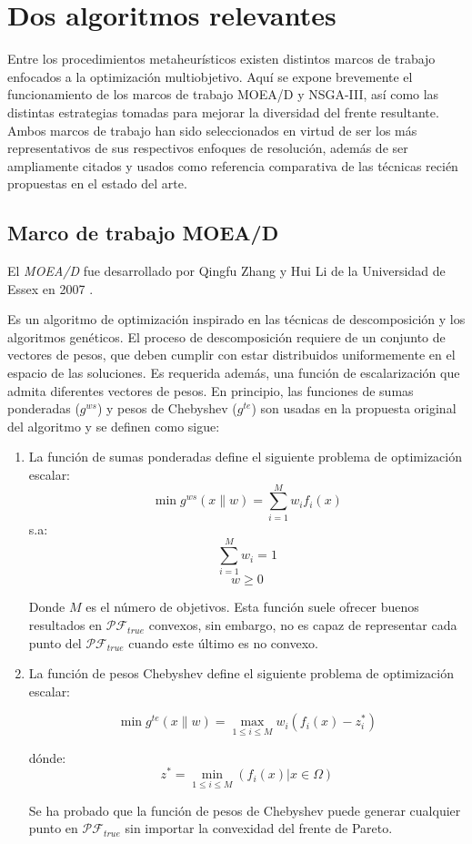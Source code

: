 \section{Dos algoritmos relevantes}

Entre los procedimientos metaheurísticos existen distintos marcos de trabajo enfocados a la optimización multiobjetivo.
Aquí se expone brevemente el funcionamiento de los marcos de trabajo MOEA/D y NSGA-III, así como las distintas estrategias tomadas para mejorar la diversidad del frente resultante.
Ambos marcos de trabajo han sido seleccionados en virtud de ser los más representativos de sus respectivos enfoques de resolución, además de ser ampliamente citados y usados como 
referencia comparativa de las técnicas recién propuestas en el estado del arte.

\subsection{Marco de trabajo MOEA/D}
El \emph{MOEA/D} fue desarrollado por Qingfu Zhang y Hui Li de la Universidad de Essex en 2007 \cite{4358754}.

Es un algoritmo de optimización inspirado en las técnicas de descomposición y los algoritmos genéticos. El proceso de descomposición requiere de un conjunto de vectores de pesos,
que deben cumplir con estar distribuidos uniformemente en el espacio de las soluciones. Es requerida además, una función de escalarización que admita diferentes vectores de pesos. En principio,
las funciones de sumas ponderadas  ($g^{ws}$) y pesos de Chebyshev ($g^{te}$) son usadas en la propuesta original del algoritmo y se definen como sigue:

\begin{enumerate}
\item La función de sumas ponderadas define el siguiente problema de optimización escalar:
$$\min g^{ws}(x\|w) = \sum^M_{i=1} w_if_i(x) $$
\blank{3cm}s.a:
$$ \sum^M_{i=1} w_i = 1$$
$$w \geq 0$$

Donde $M$ es el número de objetivos. Esta función suele ofrecer buenos resultados en $\mathcal{PF}_{true}$ convexos, sin embargo, no es capaz de representar cada punto del $\mathcal{PF}_{true}$ cuando este último es no convexo.

\item La función de pesos Chebyshev define el siguiente problema de optimización escalar:

$$\min g^{te}(x\|w) = \max_{1\leq i \leq M} w_i(f_i(x) -z_i^{*})$$

dónde:
$$z^{*}= \min_{1\leq i \leq M} (f_i(x) | x \in \Omega) $$

Se ha probado que la función de pesos de Chebyshev puede generar cualquier punto en $\mathcal{PF}_{true}$ sin importar la convexidad del frente de Pareto.
\end{enumerate}

